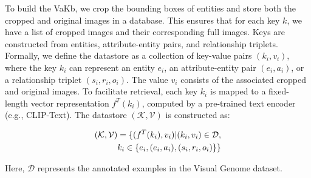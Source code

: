 To build the VaKb, we crop the bounding boxes of entities and store both the cropped and original images in a database. This ensures that for each key $k$, we have a list of cropped images and their corresponding full images. Keys are constructed from entities, attribute-entity pairs, and relationship triplets.
Formally, we define the datastore as a collection of key-value pairs $(k_i, v_i)$, where the key $k_i$ can represent an entity $e_i$, an attribute-entity pair $(e_i, a_i)$, or a relationship triplet $(s_i, r_i, o_i)$. The value $v_i$ consists of the associated cropped and original images. To facilitate retrieval, each key $k_i$ is mapped to a fixed-length vector representation $f^T(k_i)$, computed by a pre-trained text encoder (e.g., CLIP-Text).
The datastore $\left( \mathcal{K}, \mathcal{V} \right)$ is constructed as:

\vspace{-10pt}
\begin{align}
\left( \mathcal{K}, \mathcal{V} \right) = \{ (f^T(k_i), v_i) | (k_i, v_i) \in \mathcal{D}, \\ k_i \in \{ e_i,(e_i,a_i),(s_i,r_i,o_i) \} \}
\vspace{-10pt}
\end{align}

Here, $\mathcal{D}$ represents the annotated examples in the Visual Genome dataset.




